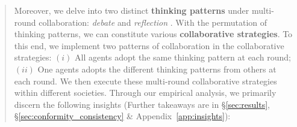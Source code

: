 \documentclass[11pt]{article}
\newcommand{\ie}{\hbox{\emph{i.e.}}\xspace}
\newcommand{\customcomment}[3]{\textcolor{#1}{[#2:#3]}}
\newcommand{\bh}[1]{\customcomment{blue}{BH}{#1}}
\begin{document}
\begin{abstract}
Moreover, we delve into two distinct \textbf{thinking patterns} under multi-round collaboration: \textit{debate} \citep{Book1971_Rhetoric,Book2005_Society-Dissent,J2009_DecisionMaking,arXiv2023_MultiAgent-Debate,arXiv2023_MultiAgent-Debate_2} and \textit{reflection} \citep{J1985_Reflection,J2003_Reflection-ContinuingEducation,Book2010_Reflection}. With the permutation of thinking patterns, we can constitute various \textbf{collaborative strategies}. To this end, we implement two patterns of collaboration in the collaborative strategies: 
$(i)$ All agents adopt the same thinking pattern at each round; 
$(ii)$ One agents adopts the different thinking patterns from others at each round. 
We then execute these multi-round collaborative strategies within different societies. 
Through our empirical analysis, we primarily discern the following insights (Further takeaways are in \S\ref{sec:results}, \S\ref{sec:conformity_consistency} \& Appendix~\ref{app:insights}): %


\end{abstract}
\end{document}
